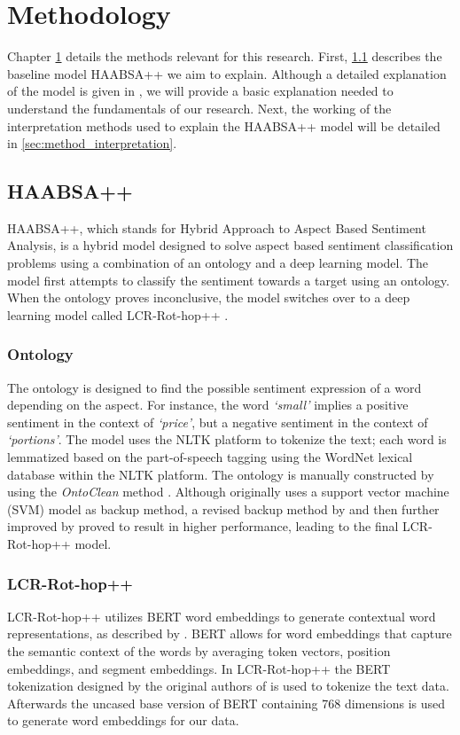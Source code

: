 \chapter{Methodology}
    \label{chap:methodology}

Chapter \ref{chap:methodology} details the methods relevant for this research. First, \ref{sec:method_haabsa} describes the baseline model HAABSA++ we aim to explain. Although a detailed explanation of the model is given in \cite{Trusca}, we will provide a basic explanation needed to understand the fundamentals of our research. Next, the working of the interpretation methods used to explain the HAABSA++ model will be detailed in \ref{sec:method_interpretation}. 

\section{HAABSA++}
    \label{sec:method_haabsa}
HAABSA++, which stands for Hybrid Approach to Aspect Based Sentiment Analysis, is a hybrid model designed to solve aspect based sentiment classification problems using a combination of an ontology and a deep learning model. The model first attempts to classify the sentiment towards a target using an ontology. When the ontology proves inconclusive, the model switches over to a deep learning model called LCR-Rot-hop++ \cite{Trusca}.

\subsection{Ontology}
    \label{sec:method_ontology}
The ontology is designed to find the possible sentiment expression of a word depending on the aspect. For instance, the word \textit{`small'} implies a positive sentiment in the context of \textit{`price'}, but a negative sentiment in the context of \textit{`portions'}. The model uses the NLTK platform to tokenize the text; each word is lemmatized based on the part-of-speech tagging using the WordNet lexical database within the NLTK platform. The ontology is manually constructed by \cite{Schouten} using the \textit{OntoClean} method \cite{Guarino}. Although \cite{Schouten} originally uses a support vector machine (SVM) model as backup method, a revised backup method by \cite{Wallaart} and then further improved by \cite{Trusca} proved to result in higher performance, leading to the final LCR-Rot-hop++ model. 

\subsection{LCR-Rot-hop++}
    \label{sec:method_lcrrothoppp}
LCR-Rot-hop++ utilizes BERT word embeddings to generate contextual word representations, as described by \cite{Devlin}. BERT allows for word embeddings that capture the semantic context of the words by averaging token vectors, position embeddings, and segment embeddings. In LCR-Rot-hop++ the BERT tokenization designed by the original authors of \cite{Devlin} is used to tokenize the text data. Afterwards the uncased base version of BERT containing 768 dimensions is used to generate word embeddings for our data.

